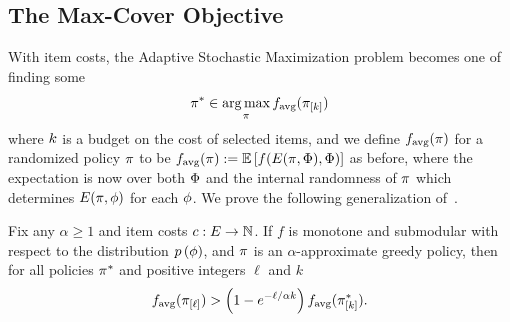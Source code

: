 %
\subsection{The Max-Cover Objective} \label{sec:proofs-max-cover}  
%

%

With item costs, the Adaptive Stochastic Maximization problem becomes one of finding some
\begin{equation}
\pi^{*}\in\mathop{\rm arg\,max}_{\pi} f_{\text{avg}}( \pi_{[{k}]} ) 
\label{eq:stochmax-costs}
\end{equation} where $k$ is a budget on the cost of selected
items, and we define $f_{\text{avg}}(\pi)$ for a randomized policy
$\pi$ to be 
$f_{\text{avg}}(\pi) := \mathbb{E}\left[f(E({\pi}, {{\color{black}{\ensuremath{\Phi}}}}), {\color{black}{\ensuremath{\Phi}}})\right]$ as before,
where the expectation is now over both ${\color{black}{\ensuremath{\Phi}}}$ and the internal
randomness of $\pi$ which determines 
$E({\pi}, {{\color{black}{\ensuremath{\phi}}}})$ for each ${\color{black}{\ensuremath{\phi}}}$.
We prove the following generalization of~.


\begin{theorem} \label{thm:max-cover-with-costs}
Fix any $\alpha \ge 1$ and item costs $c:E \to \mathbb{N}$.
If $f$ is \term monotone and \term submodular with respect to the
distribution 
${\color{black}{\ensuremath{p \left( {{\color{black}{\ensuremath{\phi}}}} \right) }}}$, and $\pi$ is an
$\alpha$-approximate greedy policy, then for all policies $\pi^*$ and positive
integers $\ell$ and $k$ 
\[
f_{\text{avg}}( \pi_{[{\ell}]} ) >  \left( {1 - e^{-\ell/\alpha k}} \right) 
f_{\text{avg}}( \pi^*_{[{k}]} ) 
\mbox{.}
\]
%
%
%
%
\end{theorem}


